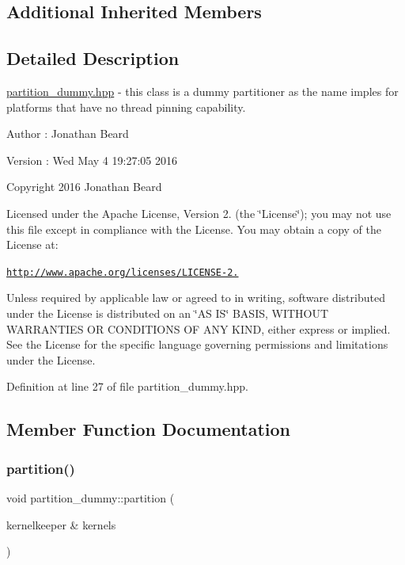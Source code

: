 \subsection*{Additional Inherited Members}


\subsection{Detailed Description}
\hyperlink{partition__dummy_8hpp_source}{partition\+\_\+dummy.\+hpp} -\/ this class is a dummy partitioner as the name imples for platforms that have no thread pinning capability.

\begin{DoxyAuthor}{Author}
\+: Jonathan Beard 
\end{DoxyAuthor}
\begin{DoxyVersion}{Version}
\+: Wed May 4 19\+:27\+:05 2016
\end{DoxyVersion}
Copyright 2016 Jonathan Beard

Licensed under the Apache License, Version 2. (the \char`\"{}\+License\char`\"{}); you may not use this file except in compliance with the License. You may obtain a copy of the License at\+:

\href{http://www.apache.org/licenses/LICENSE-2.0}{\tt http\+://www.\+apache.\+org/licenses/\+L\+I\+C\+E\+N\+S\+E-\/2.}

Unless required by applicable law or agreed to in writing, software distributed under the License is distributed on an \char`\"{}\+A\+S I\+S\char`\"{} B\+A\+S\+IS, W\+I\+T\+H\+O\+UT W\+A\+R\+R\+A\+N\+T\+I\+ES OR C\+O\+N\+D\+I\+T\+I\+O\+NS OF A\+NY K\+I\+ND, either express or implied. See the License for the specific language governing permissions and limitations under the License. 

Definition at line 27 of file partition\+\_\+dummy.\+hpp.



\subsection{Member Function Documentation}
\hypertarget{classpartition__dummy_ae40e5fa9d982e718f399fe3244435e7a}{}\label{classpartition__dummy_ae40e5fa9d982e718f399fe3244435e7a} 
\subsubsection{\texorpdfstring{partition()}{partition()}}
{\footnotesize\ttfamily void partition\+\_\+dummy\+::partition (\begin{DoxyParamCaption}\item[{kernelkeeper \&}]{kernels }\end{DoxyParamCaption})\hspace{0.3cm}{\ttfamily [virtual]}}

